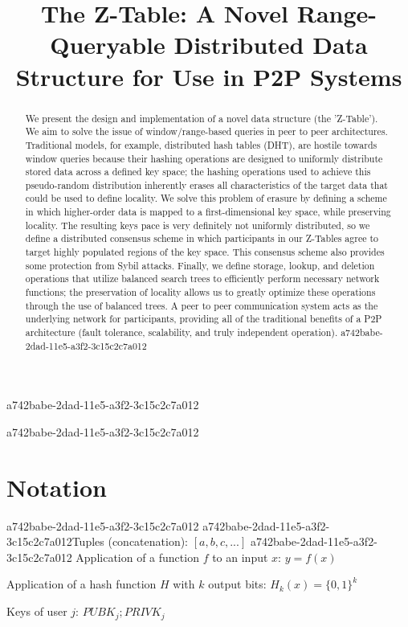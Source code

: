 \documentclass[12pt]{article}
\title{The Z-Table: A Novel Range-Queryable Distributed Data Structure for Use in P2P Systems}
\begin{document}
\maketitle

a742babe-2dad-11e5-a3f2-3c15c2c7a012\begin{abstract}
We present the design and implementation of a novel data structure (the 'Z-Table'). We aim to solve the issue of window/range-based queries in peer to peer architectures. Traditional models, for example,  distributed hash tables (DHT), are hostile towards window queries because their hashing operations are designed to uniformly distribute stored data across a defined key space; the hashing operations used to achieve this pseudo-random distribution inherently erases all characteristics of the target data that could be used to define locality. We solve this problem of erasure by defining a scheme in which higher-order data is mapped to a first-dimensional key space, while preserving locality. The resulting keys pace is very definitely not uniformly distributed, so we define a distributed consensus scheme in which participants in our Z-Tables agree to target highly populated regions of the key space. This consensus scheme also provides some protection from Sybil attacks. Finally, we define storage, lookup, and deletion operations that utilize balanced search trees to efficiently perform necessary network functions; the preservation of locality allows us to greatly optimize these operations through the use of balanced trees. A peer to peer communication system acts as the underlying network for participants, providing all of the traditional benefits of a P2P architecture (fault tolerance, scalability, and truly independent operation).
a742babe-2dad-11e5-a3f2-3c15c2c7a012\end{abstract}
a742babe-2dad-11e5-a3f2-3c15c2c7a012
\section{Notation}
a742babe-2dad-11e5-a3f2-3c15c2c7a012
a742babe-2dad-11e5-a3f2-3c15c2c7a012Tuples (concatenation): $[a,b,c,...]$
a742babe-2dad-11e5-a3f2-3c15c2c7a012
Application of a function $f$ to an input $x$: $y=f(x)$

Application of a hash function $H$ with $k$ output bits: $H_{k}(x) = \{0,1\}^k$

Keys of user $j$: $ PUBK_j; PRIVK_j $
\end{document}
